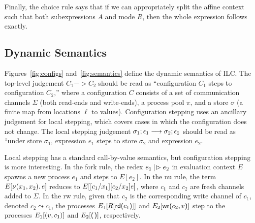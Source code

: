 Finally, the choice rule says that if we can appropriately split the affine
context such that both subexpressions $A$ and mode $R$, then the whole
expression follows exactly.

\subsection{Dynamic Semantics}
\label{subsec:semantics}



Figures~\ref{fig:configs} and~\ref{fig:semantics} define the dynamic semantics
of ILC. The top-level judgement $C_1 -> C_2$ should be read as ``configuration
$C_1$ steps to configuration $C_2$,'' where a configuration $C$ consists of a
set of communication channels $\Sigma$ (both read-ends and write-ends), a process
pool $\pi$, and a store $\sigma$ (a finite map from locations $\ell$ to
values). Configuration stepping uses an ancillary judgement for local stepping,
which covers cases in which the configuration does not change.  The
local stepping judgement $\sigma_1; \epsilon_1 \longrightarrow \sigma_2; \epsilon_2$ should be read as ``under store
$\sigma_1$, expression $e_1$ steps to store $\sigma_{2}$ and expression $e_2$.

Local stepping has a standard call-by-value semantics, but configuration
stepping is more interesting. In the fork rule, the redex $e_1 \mathrel{|\rhd} e_2$ in
evaluation context $E$ spawns a new process $e_1$ and steps to $E[e_2]$. In the
nu rule, the term $E[ \nu(x_1, x_2).\,e ]$ reduces to $E[
  [c_1/x_1][c_2/x_2]e ]$, where $c_1$ and $c_2$ are fresh
channels added to $\Sigma$. In the rw rule, given that $c_2$ is the corresponding
write channel of $c_1$, denoted $c_2 \leadsto c_1$, the processes $E_1[R[
    \text{\textsf{rd}}\textsf{(}{c_1}\textsf{)}] ]$ and $E_2[ \text{\textsf{wr}}\textsf{(}{c_2},{v}\textsf{)}]$ step to the processes
$E_1[ (v, c_1)]$ and $E_2[ \eUnit]$, respectively. 
